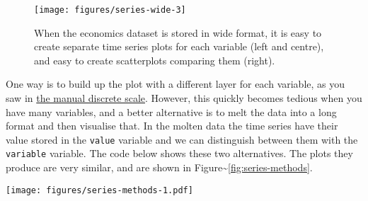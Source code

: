 \begin{figure}
\texttt{[image: figures/series-wide-3]} \caption{When the economics dataset is stored in wide format, it is easy to create separate time series plots for each variable (left and centre), and easy to create scatterplots comparing them (right).\label{fig:series-wide3}}
\end{figure}

One way is to build up the plot with a different layer for each
variable, as you saw in \hyperref[sub:scale-manual]{the manual discrete
scale}. However, this quickly becomes tedious when you have many
variables, and a better alternative is to melt the data into a long
format and then visualise that. In the molten data the time series have
their value stored in the \texttt{value} variable and we can distinguish
between them with the \texttt{variable} variable. The code below shows
these two alternatives. The plots they produce are very similar, and are
shown in Figure\textasciitilde{}\ref{fig:series-methods}.

\begin{Shaded}
\begin{Highlighting}[]
\StringTok{ }
\StringTok{  }\NormalTok{(}\NormalTok{(}  \NormalTok{)) +}\StringTok{ }
\StringTok{  }\NormalTok{(}\NormalTok{(}  \NormalTok{)) +}\StringTok{ }
\StringTok{  }\NormalTok{(}\NormalTok{)}
\end{Highlighting}
\end{Shaded}

\texttt{[image: figures/series-methods-1.pdf]}

\begin{Shaded}
\begin{Highlighting}[]

\StringTok{ }
  \NormalTok{, } 
\end{Highlighting}
\end{Shaded}

